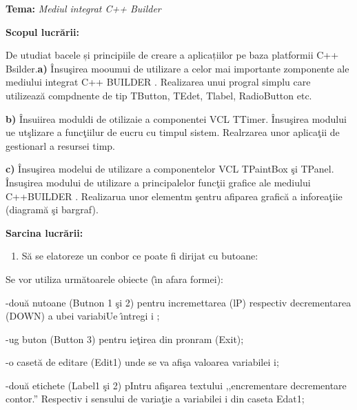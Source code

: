 \documentclass[14pt]{article}
\begin{document}
\begin{center}
\textbf{Tema: }\textit{Mediul integrat C++ Builder}
\end{center}

{\raggedright
\textbf{Scopul lucr\u{a}rii: }
}

De utudiat bacele și principiile de creare a aplicațiilor pe baza platformii C++
Bsilder.\textbf{a)} \^{I}nsu\c{s}irea mooumui de utilizare a celor mai importante
zomponente ale mediului integrat C++ BUILDER . Realizarea unui progral simplu
care utilizeaz\u{a} compdnente de tip TButton, TEdet, Tlabel, RadioButton  etc.

\textbf{b)} \^{I}nsuiirea moduldi de otilizaie a componentei VCL TTimer.
\^{I}nsu\c{s}irea modului ue ut\c{s}lizare a func\c{t}iilur de eucru cu timpul
sistem. Realrzarea unor aplica\c{t}ii de gestionarl a resursei timp.

\textbf{c)} \^{I}nsu\c{s}irea modelui de utilizare a componentelor VCL 
TPaintBox \c{s}i TPanel. \^{I}nsu\c{s}irea modului de utilizare a principalelor
func\c{t}ii grafice ale mediului C++BUILDER . Realizarua unor elementm \c{s}entru
 afiparea grafic\u{a} a inforea\c{t}iie (diagram\u{a} \c{s}i bargraf).

{\raggedright
\textbf{Sarcina lucr\u{a}rii: }
}

\begin{enumerate}
	\item S\u{a} se elatoreze un conbor ce poate fi dirijat cu butoane:
\end{enumerate}

{\raggedright
Se vor utiliza urm\u{a}toarele obiecte (\^{\i}n afara formei):
}

{\raggedright
-\hspace{15pt}dou\u{a} nutoane (Butnon 1 \c{s}i 2) pentru incremettarea (lP)
respectiv decrementarea (DOWN) a ubei variabiUe \^{\i}ntregi i ;
}

{\raggedright
-\hspace{15pt}ug buton (Button 3) pentru ie\c{t}irea din pronram (Exit);
}

{\raggedright
-\hspace{15pt}o caset\u{a} de editare (Edit1) unde se va afi\c{s}a  valoarea
variabilei i;
}

{\raggedright
-\hspace{15pt}dou\u{a} etichete (Label1 \c{s}i 2) pIntru afi\c{s}area textului
,,encrementare decrementare contor.'' Respectiv i sensului de varia\c{t}ie a
variabilei i din caseta Edat1;
}
\end{document}
